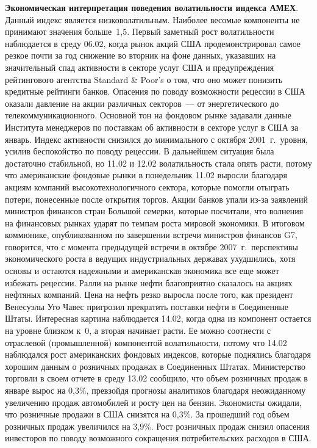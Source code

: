 \begin{multicols}{2}
{\bf Экономическая интерпретация поведения волатильности индекса
АМЕХ}. Данный индекс является низковолатильным. Наиболее весомые
компоненты не принимают значения больше~1,5. Первый заметный рост
волатильности наблюдается в среду 06.02, когда рынок акций США
продемонстрировал самое резкое почти за год снижение во вторник на
фоне данных, указавших на значительный спад активности в секторе
услуг США и предупреждения рейтингового агентства Standard \&
Poor's о том, что оно может понизить кредитные рейтинги банков.
Опасения по поводу возможности рецессии в США оказали давление на
акции различных секторов~--- от энергетического до
телекоммуникационного. Основной тон на фондовом рынке задавали
данные Института менеджеров по поставкам об активности в секторе
услуг в США за январь. Индекс активности снизился до минимального
с октября 2001~г.\ уровня, усилив беспокойство по поводу
рецессии. В дальнейшем ситуация была достаточно стабильной, но
11.02 и 12.02 волатильность стала опять расти, потому что
американские фондовые рынки в понедельник 11.02 выросли благодаря
акциям компаний высокотехнологичного сектора, которые помогли
отыграть потери, понесенные после открытия торгов. Акции банков
упали из-за заявлений министров финансов стран Большой семерки,
которые посчитали, что волнения на финансовых рынках ударят по
темпам роста мировой экономики. В итоговом коммюнике,
опубликованном по завершении встречи министров финансов G7,
говорится, что с момента предыдущей встречи в октябре 2007~г.\
перспективы экономического роста в ведущих индустриальных державах
ухудшились, хотя основы и остаются надежными и американская
экономика все еще может избежать рецессии. Ралли на рынке нефти
благоприятно сказалось на акциях нефтяных компаний. Цена на нефть
резко выросла после того, как президент Венесуэлы Уго Чавес
пригрозил прекратить поставки нефти в Соединенные Штаты.
Интересная картина наблюдается 14.02, когда одна из компонент
остается на уровне близком к~0, а вторая начинает расти. Ее можно
соотнести с отраслевой (промышленной) компонентой волатильности,
потому что 14.02 наблюдался рост американских фондовых
индексов, которые поднялись благодаря хорошим данным о розничных
продажах в Соединенных Штатах. Министерство торговли в своем
отчете в среду 13.02 сообщило, что объем розничных продаж в январе
вырос на 0,3\%, превзойдя прогнозы аналитиков благодаря
неожиданному увеличению продаж автомобилей и росту цен на бензин.
Экономисты ожидали, что розничные продажи в США снизятся на 0,3\%.
За прошедший год объем розничных продаж увеличился на 3,9\%. Рост
розничных продаж снизил опасения инвесторов по поводу возможного
сокращения потребительских расходов в США.



\end{multicols}
